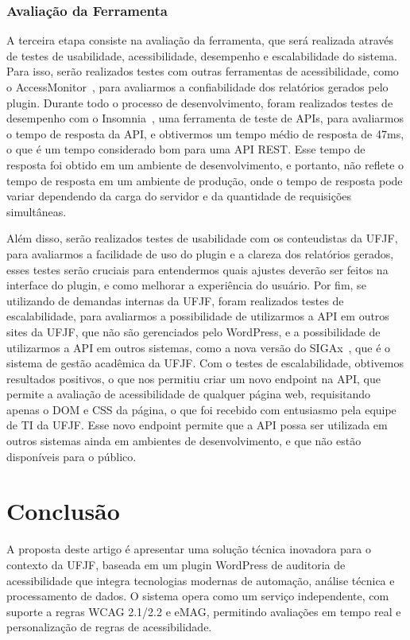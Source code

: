 \documentclass[12pt]{article}
\begin{document}
\subsubsection{Avaliação da Ferramenta}
A terceira etapa consiste na avaliação da ferramenta, que será realizada
através de testes de usabilidade, acessibilidade, desempenho e escalabilidade
do sistema. Para isso, serão realizados testes com outras ferramentas de
acessibilidade, como o AccessMonitor~\autocite{AM}, para avaliarmos a
confiabilidade dos relatórios gerados pelo plugin. Durante todo o processo
de desenvolvimento, foram realizados testes de desempenho com o Insomnia~\autocite{insomnia},
uma ferramenta de teste de APIs, para avaliarmos o tempo de resposta da API,
e obtivermos um tempo médio de resposta de 47ms, o que é um tempo considerado
bom para uma API REST. Esse tempo de resposta foi obtido em um ambiente
de desenvolvimento, e portanto, não reflete o tempo de resposta em um
ambiente de produção, onde o tempo de resposta pode variar dependendo da
carga do servidor e da quantidade de requisições simultâneas.

Além disso, serão realizados testes de usabilidade com os conteudistas da 
UFJF, para avaliarmos a facilidade de uso do plugin e a clareza dos relatórios 
gerados, esses testes serão cruciais para entendermos quais ajustes deverão 
ser feitos na interface do plugin, e como melhorar a experiência do usuário. 
Por fim, se utilizando de demandas internas da UFJF, foram realizados testes 
de escalabilidade, para avaliarmos a possibilidade de utilizarmos a API 
em outros sites da UFJF, que não são gerenciados pelo WordPress, e a 
possibilidade de utilizarmos a API em outros sistemas, como a nova versão do 
SIGAx~\autocite{SIGAx}, que é o sistema de gestão acadêmica da UFJF\@. Com
o testes de escalabilidade, obtivemos resultados positivos, o que nos
permitiu criar um novo endpoint na API, que permite a avaliação de acessibilidade
de qualquer página web, requisitando apenas o DOM e CSS da página, o que foi recebido
com entusiasmo pela equipe de TI da UFJF\@. Esse novo endpoint permite que
a API possa ser utilizada em outros sistemas ainda em ambientes de desenvolvimento,
e que não estão disponíveis para o público.

\section{Conclusão}
A proposta deste artigo é apresentar uma solução técnica inovadora para o
contexto da UFJF, baseada em um plugin WordPress de auditoria de acessibilidade
que integra tecnologias modernas de automação, análise técnica e
processamento de dados. O sistema opera como um serviço independente, com
suporte a regras WCAG 2.1/2.2 e eMAG, permitindo avaliações em tempo real
e personalização de regras de acessibilidade.
\end{document}
